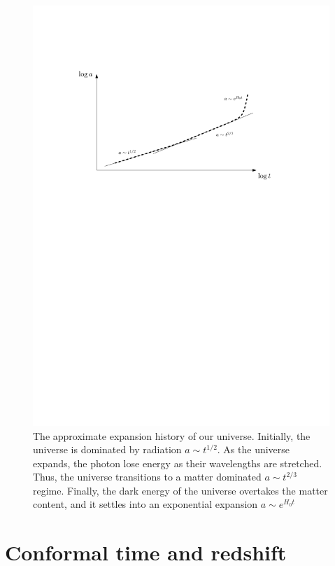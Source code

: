 \begin{figure}
  \centering
  \includegraphics[width=\textwidth]{chapter_inflationary_cosmology/figures/expansion_history}
  \caption{The approximate expansion history of our universe. Initially, the universe is dominated by radiation $a\sim t^{1/2}$. As the universe expands, the photon lose energy as their wavelengths are stretched.  Thus, the universe transitions to a matter dominated $a\sim t^{2/3}$ regime. Finally, the dark energy of the universe overtakes the matter content, and it settles into an exponential expansion $a\sim e^{H_0 t}$\label{fig:cos:expansion_history}}
\end{figure}


\section{Conformal time and redshift}
